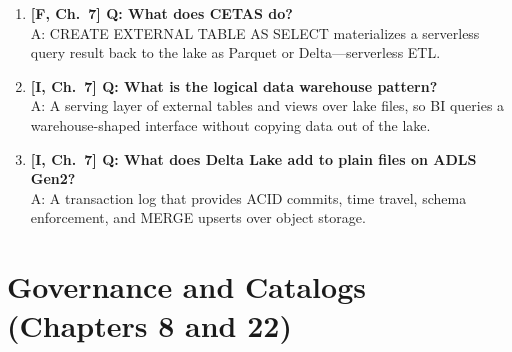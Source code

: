 \begin{enumerate}
    A: Per TB of data processed. Use Parquet/Delta, partition pruning via \texttt{filepath()}, explicit schemas, and appropriately sized files.
    \item \textbf{[F, Ch.~7] Q: What does CETAS do?}\\
    A: CREATE EXTERNAL TABLE AS SELECT materializes a serverless query result back to the lake as Parquet or Delta---serverless ETL.
    \item \textbf{[I, Ch.~7] Q: What is the logical data warehouse pattern?}\\
    A: A serving layer of external tables and views over lake files, so BI queries a warehouse-shaped interface without copying data out of the lake.
    \item \textbf{[I, Ch.~7] Q: What does Delta Lake add to plain files on ADLS Gen2?}\\
    A: A transaction log that provides ACID commits, time travel, schema enforcement, and MERGE upserts over object storage.
\end{enumerate}

\section{Governance and Catalogs (Chapters 8 and 22)}

